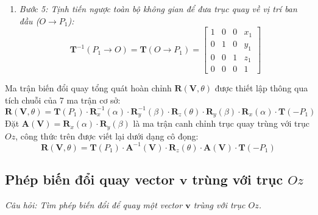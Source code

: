 \begin{enumerate}
\begin{equation}
    \end{equation}
    \item \textit{Bước 5: Tịnh tiến ngược toàn bộ không gian để đưa trục quay về vị trí ban đầu ($O \to P_1$):}
    \begin{equation}
    \mathbf{T}^{-1}(P_1 \to O) = \mathbf{T}(O \to P_1) = \begin{bmatrix} 1 & 0 & 0 & x_1 \\ 0 & 1 & 0 & y_1 \\ 0 & 0 & 1 & z_1 \\ 0 & 0 & 0 & 1 \end{bmatrix}
    \end{equation}
\end{enumerate}

Ma trận biến đổi quay tổng quát hoàn chỉnh $\mathbf{R}(\mathbf{V}, \theta)$ được thiết lập thông qua tích chuỗi của 7 ma trận cơ sở:
\begin{equation}
\label{eq:composite_arbitrary_axis_rotation}
\mathbf{R}(\mathbf{V}, \theta) = \mathbf{T}(P_1) \cdot \mathbf{R}_x^{-1}(\alpha) \cdot \mathbf{R}_y^{-1}(\beta) \cdot \mathbf{R}_z(\theta) \cdot \mathbf{R}_y(\beta) \cdot \mathbf{R}_x(\alpha) \cdot \mathbf{T}(-P_1)
\end{equation}
Đặt $\mathbf{A}(\mathbf{V}) = \mathbf{R}_x(\alpha) \cdot \mathbf{R}_y(\beta)$ là ma trận canh chỉnh trục quay trùng với trục $Oz$, công thức trên được viết lại dưới dạng cô đọng:
\begin{equation}
\mathbf{R}(\mathbf{V}, \theta) = \mathbf{T}(P_1) \cdot \mathbf{A}^{-1}(\mathbf{V}) \cdot \mathbf{R}_z(\theta) \cdot \mathbf{A}(\mathbf{V}) \cdot \mathbf{T}(-P_1)
\end{equation}

\subsection{Phép biến đổi quay vector \texorpdfstring{$\mathbf{v}$}{v} trùng với trục \texorpdfstring{$Oz$}{Oz}}
\label{subsec:w6_v_to_z}

\textit{Câu hỏi: Tìm phép biến đổi để quay một vector $\mathbf{v}$ trùng với trục $Oz$.}

